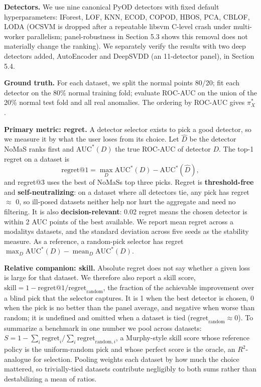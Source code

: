 \documentclass[3p,twocolumn]{elsarticle}
\begin{document}
\textbf{Detectors.} We use nine canonical PyOD detectors \cite{ref6} with fixed default hyperparameters: IForest, LOF, KNN, ECOD, COPOD, HBOS, PCA, CBLOF, LODA (OCSVM is dropped after a repeatable libsvm C-level crash under multi-worker parallelism; panel-robustness in Section 5.3 shows this removal does not materially change the ranking). We separately verify the results with two deep detectors added, AutoEncoder and DeepSVDD \cite{ref14} (an 11-detector panel), in Section 5.4.

\textbf{Ground truth.} For each dataset, we split the normal points 80/20; fit each detector on the 80\% normal training fold; evaluate ROC-AUC on the union of the 20\% normal test fold and all real anomalies. The ordering by ROC-AUC gives \(\pi_X^*\).

\textbf{Primary metric: regret.} A detector selector exists to pick a good detector, so we measure it by what the user loses from its choice. Let \(\hat D\) be the detector NoMaS ranks first and \(\mathrm{AUC}^*(D)\) the true ROC-AUC of detector \(D\). The top-1 regret on a dataset is
\[\mathrm{regret@1} = \max_{D} \mathrm{AUC}^*(D) - \mathrm{AUC}^*(\hat D),\]
and regret@3 uses the best of NoMaS\textquotesingle s top three picks. Regret is \textbf{threshold-free} and \textbf{self-neutralizing}: on a dataset where all detectors tie, any pick has regret $\approx$ 0, so ill-posed datasets neither help nor hurt the aggregate and need no filtering. It is also \textbf{decision-relevant}: 0.02 regret means the chosen detector is within 2 AUC points of the best available. We report mean regret across a modality\textquotesingle s datasets, and the standard deviation across five seeds as the stability measure. As a reference, a random-pick selector has regret \(\max_D \mathrm{AUC}^*(D) - \operatorname{mean}_D \mathrm{AUC}^*(D)\).

\textbf{Relative companion: skill.} Absolute regret does not say whether a given loss is large for that dataset. We therefore also report a skill score, \(\mathrm{skill} = 1 - \mathrm{regret@1} / \mathrm{regret}_{\text{random}}\), the fraction of the achievable improvement over a blind pick that the selector captures. It is 1 when the best detector is chosen, 0 when the pick is no better than the panel average, and negative when worse than random; it is undefined and omitted when a dataset is tied (\(\mathrm{regret}_{\text{random}} \approx 0\)). To summarize a benchmark in one number we pool across datasets: \(S = 1 - \sum_i \mathrm{regret}_i / \sum_i \mathrm{regret}_{\text{random},i}\), a Murphy-style skill score whose reference policy is the uniform-random pick and whose perfect score is the oracle, an \(R^2\)-analogue for selection. Pooling weights each dataset by how much the choice mattered, so trivially-tied datasets contribute negligibly to both sums rather than destabilizing a mean of ratios.
\end{document}
